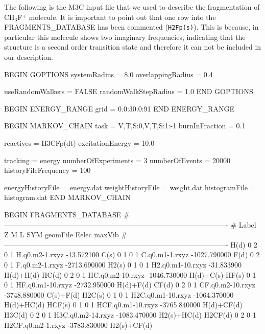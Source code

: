 \documentclass[a4paper,12pt]{article}
\begin{document}
The following is the M3C input file that we used to describe the fragmentation of CH$_3$F$^+$ molecule. It is important 
to point out that one row into the FRAGMENTS\_DATABASE has been commented (\texttt{H2Fp(s)}). This is because, in 
particular this molecule shows two imaginary frequencies, indicating that the structure is a second order transition state and 
therefore it can not be included in our description.

\begin{bifile}[caption=\footnotesize M3C input file to describe the fragmentation of CH$_3$F$^+$ molecule (CH3F+.m3c)]
BEGIN GOPTIONS
	systemRadius = 8.0
	overlappingRadius = 0.4
	
	useRandomWalkers = FALSE
	randomWalkStepRadius = 1.0
END GOPTIONS

BEGIN ENERGY_RANGE
	grid  =  0.0:30.0:91
END ENERGY_RANGE

BEGIN MARKOV_CHAIN
	task = V,T,S:0,V,T,S:1:-1
	burnInFraction = 0.1
	
	reactives = H3CFp(dt)
	excitationEnergy = 10.0

	tracking = energy
	numberOfExperiments = 3
	numberOfEvents  = 20000
	historyFileFrequency = 100
	
	energyHistoryFile = energy.dat
	weightHistoryFile = weight.dat
	histogramFile = histogram.dat
END MARKOV_CHAIN

BEGIN FRAGMENTS_DATABASE
	#----------------------------------------------------------------------------------------------
	#     Label    Z  M  L  SYM               geomFile               Eelec              maxVib
	#----------------------------------------------------------------------------------------------
		     H(d)    0  2  0    1         H.q0.m2-1.rxyz          -13.572100
		     C(s)    0  1  0    1         C.q0.m1-1.rxyz        -1027.790000
		     F(d)    0  2  0    1         F.q0.m2-1.rxyz        -2713.690000
		    H2(s)    0  1  0    1       H2.q0.m1-10.rxyz          -31.833900           H(d)+H(d)
		    HC(d)    0  2  0    1       HC.q0.m2-10.rxyz        -1046.730000           H(d)+C(s)
		    HF(s)    0  1  0    1       HF.q0.m1-10.rxyz        -2732.950000           H(d)+F(d)
		    CF(d)    0  2  0    1       CF.q0.m2-10.rxyz        -3748.880000           C(s)+F(d)
		   H2C(s)    0  1  0    1      H2C.q0.m1-10.rxyz        -1064.370000          H(d)+HC(d)
		   HCF(s)    0  1  0    1      HCF.q0.m1-10.rxyz        -3765.840000          H(d)+CF(d)
		   H3C(d)    0  2  0    1      H3C.q0.m2-14.rxyz        -1083.470000         H2(s)+HC(d)
		  H2CF(d)    0  2  0    1      H2CF.q0.m2-1.rxyz        -3783.830000         H2(s)+CF(d)
		

\end{bifile}
\end{document}
